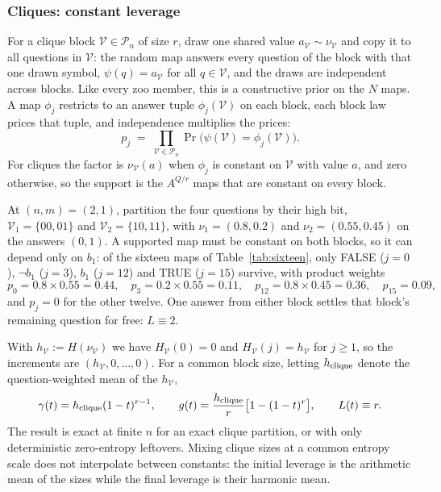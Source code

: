 \subsubsection{Cliques: constant leverage}

For a clique block $\mathcal V \in \mathcal P_n$ of size $r$, draw one
shared value $a_{\mathcal V}\sim\nu_{\mathcal V}$ and copy it to all
questions in $\mathcal V$: the random map answers every question of
the block with that one drawn symbol, $\psi(q) = a_{\mathcal V}$ for
all $q \in \mathcal V$, and the draws are independent across blocks.
Like every zoo member, this is a constructive prior on the $N$ maps.
A map $\phi_j$ restricts to an answer tuple $\phi_j(\mathcal V)$ on
each block, each block law prices that tuple, and independence
multiplies the prices:
%
\begin{equation}
  p_j \;=\; \prod_{\mathcal V\in\mathcal P_n}
  \Pr\big(\psi(\mathcal V) = \phi_j(\mathcal V)\big).
  \label{eq:blockproduct}
\end{equation}
%
For cliques the factor is $\nu_{\mathcal V}(a)$ when $\phi_j$ is
constant on $\mathcal V$ with value $a$, and zero otherwise, so the
support is the $A^{Q/r}$ maps that are constant on every block.

\begin{example}
At $(n,m) = (2,1)$, partition the four questions by their high bit,
$\mathcal V_1 = \{00, 01\}$ and $\mathcal V_2 = \{10, 11\}$, with
$\nu_1 = (0.8, 0.2)$ and $\nu_2 = (0.55, 0.45)$ on the answers
$(0,1)$. A supported map must be constant on both blocks, so it can
depend only on $b_1$: of the sixteen maps of
Table~\ref{tab:sixteen}, only FALSE ($j=0$), $\lnot b_1$ ($j=3$),
$b_1$ ($j=12$) and TRUE ($j=15$) survive, with product weights
\begin{equation}
  p_0 = 0.8\times0.55 = 0.44,\quad
  p_3 = 0.2\times0.55 = 0.11,\quad
  p_{12} = 0.8\times0.45 = 0.36,\quad
  p_{15} = 0.09,
\end{equation}
and $p_j = 0$ for the other twelve. One answer from either block
settles that block's remaining question for free: $L \equiv 2$.
\end{example}

With $h_{\mathcal V} := H(\nu_{\mathcal V})$ we have
$H_{\mathcal V}(0) = 0$ and $H_{\mathcal V}(j) = h_{\mathcal V}$ for
$j \ge 1$, so the increments are
$(h_{\mathcal V}, 0, \ldots, 0)$. For a common block size, letting
$h_{\rm clique}$ denote the question-weighted mean of the
$h_{\mathcal V}$,
%
\begin{equation}
  \gamma(t) = h_{\rm clique}(1-t)^{r-1},
  \qquad
  g(t) = \frac{h_{\rm clique}}{r}\big[1-(1-t)^r\big],
  \qquad
  L(t)\equiv r.
  \label{eq:clique}
\end{equation}
%
The result is exact at finite $n$ for an exact clique partition, or
with only deterministic zero-entropy leftovers. Mixing clique sizes
at a common entropy scale does not interpolate between constants: the
initial leverage is the arithmetic mean of the sizes while the final
leverage is their harmonic mean.

